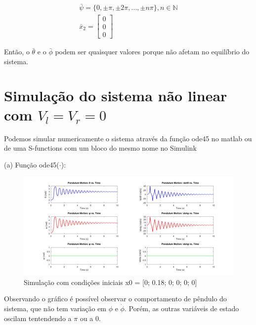 \documentclass[10pt]{article}
\begin{document}
\begin{equation}
\begin{gathered}
    \bar\psi = \{0,\pm\pi,\pm 2\pi,...,\pm n\pi\}, n \in \mathbb{N} \\
    \bar{x}_2 =
    \begin{bmatrix}
        0 \\
        0 \\
        0
    \end{bmatrix}
\end{gathered}
\end{equation}

\quad Então, o $\bar\theta$ e o $\bar\phi$ podem ser quaisquer valores porque não afetam no equilíbrio do sistema.

\section{Simulação do sistema não linear com $V_l = V_r = 0$}

\quad Podemos simular numericamente o sistema através da função ode45 no matlab ou
de uma S-functions com um bloco do mesmo nome no Simulink

\newpage

\quad (a) Função ode45($\cdot$):

\begin{figure}[h]
    \centering
    \includegraphics[scale=0.229]{ode45_1.png}
    \caption{Simulação com condições iniciais x0 = [0; 0.18; 0; 0; 0; 0]}
\end{figure}

\quad Observando o gráfico é possível observar o comportamento de pêndulo do sistema, que não tem variação em $\phi$ e $\dot\phi$.
Porém, as outras variáveis de estado oscilam tentendendo a $\pi$ ou a $0$.
\end{document}
